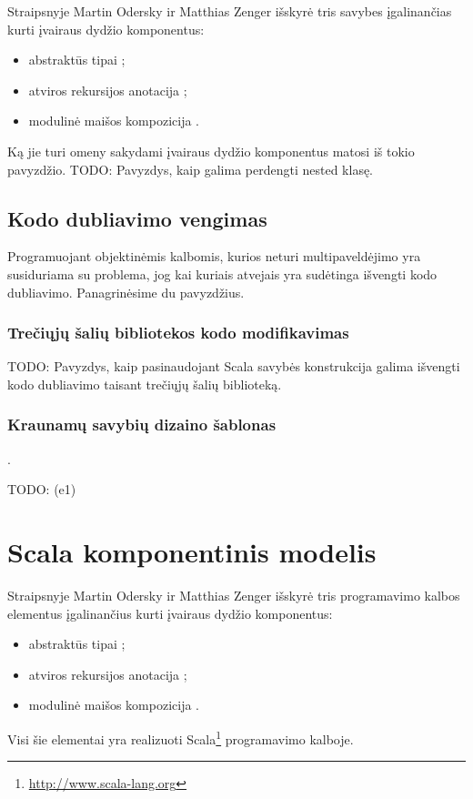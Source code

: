 Straipsnyje \cite{scalable-component-abstractions} Martin Odersky
ir Matthias Zenger išskyrė tris savybes įgalinančias kurti
įvairaus dydžio  komponentus:
\begin{itemize}
  \item abstraktūs tipai ;
  \item atviros rekursijos anotacija ;
  \item modulinė maišos kompozicija .
\end{itemize}

Ką jie turi omeny sakydami įvairaus dydžio komponentus matosi
iš tokio pavyzdžio.
TODO: Pavyzdys, kaip galima perdengti nested klasę.

\subsection{Kodo dubliavimo vengimas}

Programuojant objektinėmis kalbomis, kurios neturi multipaveldėjimo
yra susiduriama su problema, jog kai kuriais atvejais yra sudėtinga
išvengti kodo dubliavimo. Panagrinėsime du pavyzdžius.

\subsubsection{Trečiųjų šalių bibliotekos kodo modifikavimas}

TODO: Pavyzdys, kaip pasinaudojant Scala savybės  konstrukcija
galima išvengti kodo dubliavimo taisant trečiųjų šalių biblioteką.

\subsubsection{Kraunamų savybių dizaino šablonas}

\cite[267p.]{programming-in-scala}.

TODO: (e1)

\section{Scala komponentinis modelis}

Straipsnyje \cite{scalable-component-abstractions} Martin Odersky
ir Matthias Zenger išskyrė tris programavimo kalbos elementus
įgalinančius kurti įvairaus dydžio  komponentus:
\begin{itemize}
  \item abstraktūs tipai ;
  \item atviros rekursijos anotacija ;
  \item modulinė maišos kompozicija .
\end{itemize}
Visi šie elementai yra realizuoti
Scala\footnote{\url{http://www.scala-lang.org}} programavimo kalboje.

